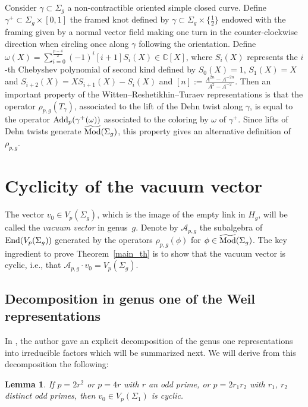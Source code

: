 \documentclass[11pt]{article}
\numberwithin{equation}{section}
\newtheorem{Lemma}[Theorem]{Lemma}
\begin{document}
Consider $\gamma\subset \Sigma_g$ a non-contractible oriented simple closed curve. Define $\gamma^+\subset \Sigma_g\times [0,1]$ the framed knot defined by $\gamma\subset \Sigma_g\times \big\{ \frac{1}{2} \big\}$ endowed with the framing given by a normal vector field making one turn in the counter-clockwise direction when circling once along $\gamma$ following the orientation. Define $\omega(X)=\sum\limits_{i=0}^ {\frac{p-4}{2}} (-1)^i [i+1]S_i(X) \in \mathbb{C}[X]$, where $S_i(X)$ represents the $i$-{th} Chebyshev polynomial of second kind defined by $S_0(X)=1$, $S_1(X)=X$ and $S_{i+2}(X)=XS_{i+1}(X)-S_i(X) $ and $[n]:= \frac{A^{2n}-A^{-2n}}{A^2 - A^{-2}}$. Then an important property of the Witten--Reshetikhin--Turaev representations is that the operator $\rho_{p,g}(T_{\gamma})$, associated to the lift of the Dehn twist along $\gamma$, is equal to the operator $\operatorname{Add}_p(\gamma^+(\omega))$ associated to the coloring by $\omega$ of $\gamma^+$. Since lifts of Dehn twists generate $\widetilde{\operatorname{Mod}}(\Sigma_g)$, this property gives an alternative definition of $\rho_{p,g}$.

\section{Cyclicity of the vacuum vector}

The vector $v_0\in V_p(\Sigma_g)$, which is the image of the empty link in $H_g$, will be called the \textit{vacuum vector} in genus~$g$. Denote by $\mathcal{A}_{p,g}$ the subalgebra of $\operatorname{End}(V_p(\Sigma_g))$ generated by the operators $\rho_{p,g}(\phi)$ for $\phi \in \widetilde{\operatorname{Mod}}(\Sigma_g)$. The key ingredient to prove Theorem~\ref{main_th} is to show that the vacuum vector is cyclic, i.e., that $\mathcal{A}_{p,g}\cdot v_0 =V_p(\Sigma_g)$.

\subsection{Decomposition in genus one of the Weil representations}
In \cite[Corollary 1.2]{Koju1}, the author gave an explicit decomposition of the genus one representations into irreducible factors which will be summarized next. We will derive from this decomposition the following:
\begin{Lemma}\label{lemma_genusone1} If $p=2r^2$ or $p=4r$ with $r$ an odd prime, or $p=2r_1r_2$ with $r_1$, $r_2$ distinct odd primes, then $v_0 \in V_p(\Sigma_1)$ is cyclic.
\end{Lemma}
\end{document}
